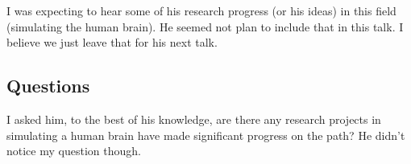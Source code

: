 \documentclass[11pt, oneside]{article}   	%
\begin{document}
I was expecting to hear some of his research progress (or his ideas) in this field (simulating the human brain). He seemed not plan to include that in this talk. I believe we just leave that for his next talk.

\subsection{Questions}
I asked him, to the best of his knowledge, are there any research projects in simulating a human brain have made significant progress on the path? He didn't notice my question though.
\end{document}

